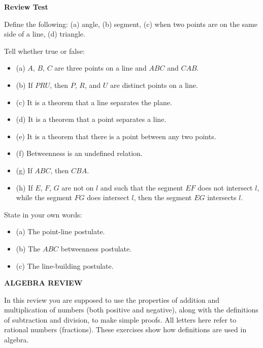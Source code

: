 \documentclass[11pt]{book}
\theoremstyle{bkplain}
\begin{document}
\begin{center}\bfseries Review Test\end{center}

\begin{exlist}
\item Define the following: (a) angle, (b) segment, (c) when two points are on
      the same side of a line, (d) triangle.
\item Tell whether true or false:
      \begin{itemize}[label=,leftmargin=1.4em,itemsep=1pt,topsep=2pt]
      \item (a) $A$, $B$, $C$ are three points on a line and $ABC$ and $CAB$.
      \item (b) If $PRU$, then $P$, $R$, and $U$ are distinct points on a line.
      \item (c) It is a theorem that a line separates the plane.
      \item (d) It is a theorem that a point separates a line.
      \item (e) It is a theorem that there is a point between any two points.
      \item (f) Betweenness is an undefined relation.
      \item (g) If $ABC$, then $CBA$.
      \item (h) If $E$, $F$, $G$ are not on $l$ and such that the segment $EF$
            does not intersect $l$, while the segment $FG$ does intersect $l$,
            then the segment $EG$ intersects $l$.
      \end{itemize}
\item State in your own words:
      \begin{itemize}[label=,leftmargin=1.4em,itemsep=1pt,topsep=2pt]
      \item (a) The point-line postulate.
      \item (b) The $ABC$ betweenness postulate.
      \item (c) The line-building postulate.
      \end{itemize}
\end{exlist}

\begin{center}\bfseries ALGEBRA REVIEW\end{center}

In this review you are supposed to use the properties of addition and
multiplication of numbers (both positive and negative), along with the
definitions of subtraction and division, to make simple proofs. All letters here
refer to rational numbers (fractions). These exercises show how definitions are
used in algebra.
\end{document}
